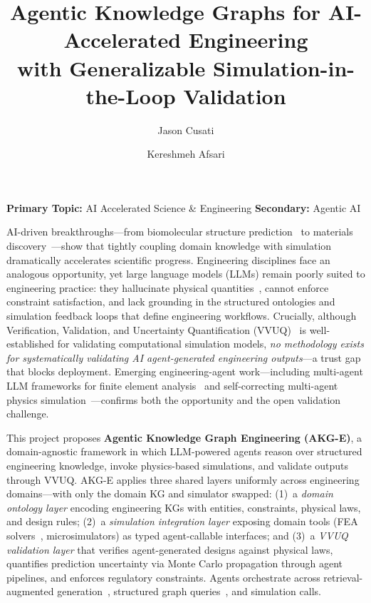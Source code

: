 \documentclass[conference, 10pt]{IEEEtran}
\title{Agentic Knowledge Graphs for AI-Accelerated Engineering\\with Generalizable Simulation-in-the-Loop Validation}
\author{Jason Cusati \and Kereshmeh Afsari}
\date{}
\begin{document}
\maketitle
\thispagestyle{empty}

\vspace{-1.5em}

\noindent\textbf{Primary Topic:} AI Accelerated Science \& Engineering \hfill
\textbf{Secondary:} Agentic AI

\vspace{0.5em}

AI-driven breakthroughs---from biomolecular structure prediction~\cite{Abramson2024AlphaFold3} to materials discovery~\cite{Merchant2023GNoME}---show that tightly coupling domain knowledge with simulation dramatically accelerates scientific progress. Engineering disciplines face an analogous opportunity, yet large language models (LLMs) remain poorly suited to engineering practice: they hallucinate physical quantities~\cite{Ji2023HallucinationSurvey}, cannot enforce constraint satisfaction, and lack grounding in the structured ontologies and simulation feedback loops that define engineering workflows. Crucially, although Verification, Validation, and Uncertainty Quantification (VVUQ)~\cite{Oberkampf2010VVUQ} is well-established for validating computational simulation models, \textit{no methodology exists for systematically validating AI agent-generated engineering outputs}---a trust gap that blocks deployment. Emerging engineering-agent work---including multi-agent LLM frameworks for finite element analysis~\cite{LLMAgentsFEM2025} and self-correcting multi-agent physics simulation~\cite{Park2026MCPSIM}---confirms both the opportunity and the open validation challenge.

This project proposes \textbf{Agentic Knowledge Graph Engineering (AKG-E)}, a domain-agnostic framework in which LLM-powered agents reason over structured engineering knowledge, invoke physics-based simulations, and validate outputs through VVUQ. AKG-E applies three shared layers uniformly across engineering domains---with only the domain KG and simulator swapped: (1)~a \textit{domain ontology layer} encoding engineering KGs with entities, constraints, physical laws, and design rules; (2)~a \textit{simulation integration layer} exposing domain tools (FEA solvers~\cite{Logg2012FEniCS}, microsimulators) as typed agent-callable interfaces; and (3)~a \textit{VVUQ validation layer} that verifies agent-generated designs against physical laws, quantifies prediction uncertainty via Monte Carlo propagation through agent pipelines, and enforces regulatory constraints. Agents orchestrate across retrieval-augmented generation~\cite{Lewis2020RAG}, structured graph queries~\cite{Edge2024GraphRAG}, and simulation calls.
\end{document}
